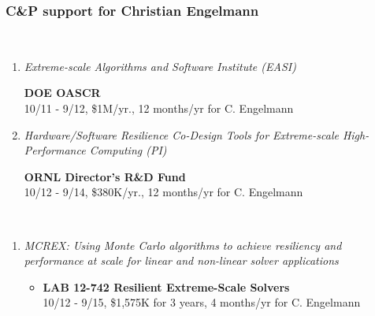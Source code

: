 
\subsubsection{C\&P support for Christian Engelmann}

\\

\begin{enumerate}
  \vspace{-2ex}
  \parskip = -2pt

\item{\em Extreme-scale Algorithms and Software Institute (EASI)}
  \begin{itemize}
    {\bf DOE OASCR}\\
    10/11 - 9/12, \$1M/yr., 12 months/yr for C. Engelmann
  \end{itemize}

\item{\em Hardware/Software Resilience Co-Design Tools for Extreme-scale
    High-Performance Computing (PI)}
  \begin{itemize}
    {\bf ORNL Director's R\&D Fund}\\
    10/12 - 9/14, \$380K/yr., 12 months/yr for C. Engelmann
  \end{itemize}

\end{enumerate}


\\

\begin{enumerate}
  \vspace{-2ex}
  \parskip = -2pt

\item{\em MCREX: Using Monte Carlo algorithms to achieve resiliency 
    and performance at scale for linear and non-linear solver
    applications}
  \begin{itemize}
  \item
    {\bf LAB 12-742 Resilient Extreme-Scale Solvers}\\
    10/12 - 9/15, \$1,575K for 3 years, 4 months/yr for C. Engelmann
  \end{itemize}
  
\end{enumerate}

